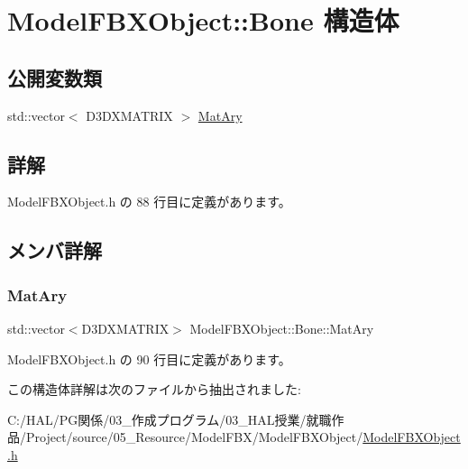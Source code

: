 \hypertarget{struct_model_f_b_x_object_1_1_bone}{}\section{Model\+F\+B\+X\+Object\+:\+:Bone 構造体}
\label{struct_model_f_b_x_object_1_1_bone}
\subsection*{公開変数類}
\begin{DoxyCompactItemize}
\item 
std\+::vector$<$ D3\+D\+X\+M\+A\+T\+R\+IX $>$ \mbox{\hyperlink{struct_model_f_b_x_object_1_1_bone_a3ba9177fd7b517af8eb94c6f807b16da}{Mat\+Ary}}
\end{DoxyCompactItemize}


\subsection{詳解}


 Model\+F\+B\+X\+Object.\+h の 88 行目に定義があります。



\subsection{メンバ詳解}
\mbox{\label{struct_model_f_b_x_object_1_1_bone_a3ba9177fd7b517af8eb94c6f807b16da}} 
\subsubsection{\texorpdfstring{Mat\+Ary}{MatAry}}
{\footnotesize\ttfamily std\+::vector$<$D3\+D\+X\+M\+A\+T\+R\+IX$>$ Model\+F\+B\+X\+Object\+::\+Bone\+::\+Mat\+Ary}



 Model\+F\+B\+X\+Object.\+h の 90 行目に定義があります。



この構造体詳解は次のファイルから抽出されました\+:\begin{DoxyCompactItemize}
\item 
C\+:/\+H\+A\+L/\+P\+G関係/03\+\_\+作成プログラム/03\+\_\+\+H\+A\+L授業/就職作品/\+Project/source/05\+\_\+\+Resource/\+Model\+F\+B\+X/\+Model\+F\+B\+X\+Object/\mbox{\hyperlink{_model_f_b_x_object_8h}{Model\+F\+B\+X\+Object.\+h}}\end{DoxyCompactItemize}
